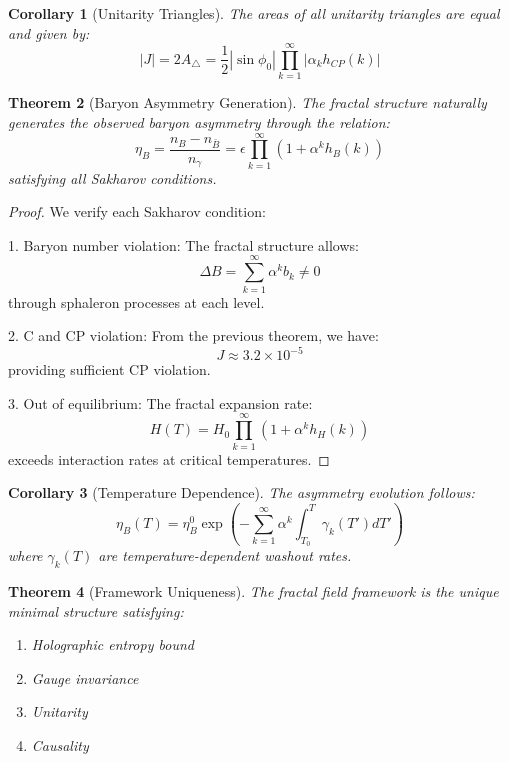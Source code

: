 \documentclass[12pt]{article}
\newtheorem{theorem}{Theorem}[section]
\newtheorem{corollary}[theorem]{Corollary}
\begin{document}
\begin{corollary}[Unitarity Triangles]
The areas of all unitarity triangles are equal and given by:
\[
|J| = 2A_{\triangle} = \frac{1}{2}|\sin\phi_0|\prod_{k=1}^{\infty}|\alpha_k h_{CP}(k)|
\]
\end{corollary}

\begin{theorem}[Baryon Asymmetry Generation]
The fractal structure naturally generates the observed baryon asymmetry through the relation:
\[
\eta_B = \frac{n_B - n_{\bar{B}}}{n_\gamma} = \epsilon \prod_{k=1}^{\infty} (1 + \alpha^k h_B(k))
\]
satisfying all Sakharov conditions.
\end{theorem}

\begin{proof}
We verify each Sakharov condition:

1. Baryon number violation:
   The fractal structure allows:
   \[
   \Delta B = \sum_{k=1}^{\infty} \alpha^k b_k \neq 0
   \]
   through sphaleron processes at each level.

2. C and CP violation:
   From the previous theorem, we have:
   \[
   J \approx 3.2 \times 10^{-5}
   \]
   providing sufficient CP violation.

3. Out of equilibrium:
   The fractal expansion rate:
   \[
   H(T) = H_0\prod_{k=1}^{\infty} (1 + \alpha^k h_H(k))
   \]
   exceeds interaction rates at critical temperatures.
\end{proof}

\begin{corollary}[Temperature Dependence]
The asymmetry evolution follows:
\[
\eta_B(T) = \eta_B^0 \exp\left(-\sum_{k=1}^{\infty} \alpha^k \int_{T_0}^T \gamma_k(T') dT'\right)
\]
where $\gamma_k(T)$ are temperature-dependent washout rates.
\end{corollary}

\begin{theorem}[Framework Uniqueness]
The fractal field framework is the unique minimal structure satisfying:
\begin{enumerate}
  \item Holographic entropy bound
  \item Gauge invariance
  \item Unitarity
  \item Causality
\end{enumerate}
\end{theorem}
\end{document}
